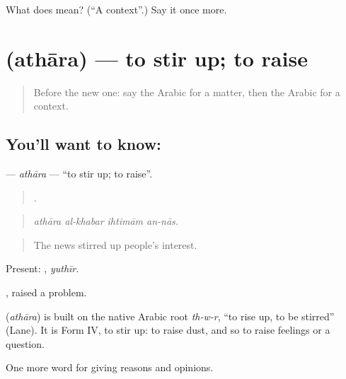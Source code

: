 \begin{tcolorbox}[breakable,colback=teal!4,colframe=teal!35!black,title={Before you move on}]
What does  mean? (\textquotedblleft{}A context\textquotedblright{}.) Say it once more.
\end{tcolorbox}
\section[\texorpdfstring{\ar{أثار} (athāra)}{أثار (athāra)}]{ (athāra) — to stir up; to raise}

\label{lesson:AR-C361-athara}



\begin{quote}
Before the new one: say the Arabic for a matter, then the Arabic for a context.
\end{quote}

\subsection*{You'll want to know: }
\textbf{} — \emph{athāra} — \textquotedblleft{}to stir up; to raise\textquotedblright{}.

\begin{quote}
   .
\end{quote}

\begin{quote}
\emph{athāra al-khabar ihtimām an-nās.}
\end{quote}

\begin{quote}
The news stirred up people's interest.
\end{quote}

Present: , \emph{yuthīr}.

 , raised a problem.

\begin{cousinweb}
\textbf{} (\emph{athāra}) is built on the native Arabic root \emph{th-w-r}, \textquotedblleft{}to rise up, to be stirred\textquotedblright{} (Lane). It is Form IV, to stir up: to raise dust, and so to raise feelings or a question.
\end{cousinweb}

\begin{grammarlens}[title={What you've built}]
One more word for giving reasons and opinions.
\end{grammarlens}

